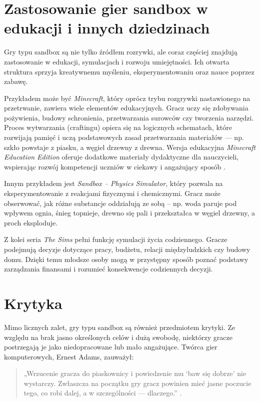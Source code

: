 \documentclass[a4paper,12pt]{book} %
\begin{document}
\section{Zastosowanie gier sandbox w edukacji i innych dziedzinach}

Gry typu sandbox są nie tylko źródłem rozrywki, ale coraz częściej znajdują zastosowanie w edukacji, symulacjach i rozwoju umiejętności. Ich otwarta struktura sprzyja kreatywnemu myśleniu, eksperymentowaniu oraz nauce poprzez zabawę.

Przykładem może być \textit{Minecraft}, który oprócz trybu rozgrywki nastawionego na przetrwanie, zawiera wiele elementów edukacyjnych. Gracz uczy się zdobywania pożywienia, budowy schronienia, przetwarzania surowców czy tworzenia narzędzi. Proces wytwarzania (craftingu) opiera się na logicznych schematach, które rozwijają pamięć i uczą podstawowych zasad przetwarzania materiałów --- np. szkło powstaje z piasku, a węgiel drzewny z drewna. Wersja edukacyjna \textit{Minecraft Education Edition} oferuje dodatkowe materiały dydaktyczne dla nauczycieli, wspierając rozwój kompetencji uczniów w ciekawy i angażujący sposób \cite{Minecraft_education}.

Innym przykładem jest  \textit{Sandbox – Physics Simulator}, który pozwala na eksperymentowanie z reakcjami fizycznymi i chemicznymi. Gracz może obserwować, jak różne substancje oddziałują ze sobą – np. woda paruje pod wpływem ognia, śnieg topnieje, drewno się pali i przekształca w węgiel drzewny, a proch eksploduje.

Z kolei seria \textit{The Sims} pełni funkcję symulacji życia codziennego. Gracze podejmują decyzje dotyczące pracy, budżetu, relacji międzyludzkich czy budowy domu. Dzięki temu młodsze osoby mogą w przystępny sposób poznać podstawy zarządzania finansami i rozumieć konsekwencje codziennych decyzji.

\section{Krytyka}

Mimo licznych zalet, gry typu sandbox są również przedmiotem krytyki. Ze względu na brak jasno określonych celów i dużą swobodę, niektórzy gracze postrzegają je jako niedopracowane lub mało angażujące. Twórca gier komputerowych, Ernest Adams, zauważył:
\begin{quote}
„Wrzucenie gracza do piaskownicy i powiedzenie mu ‘baw się dobrze’ nie wystarczy. Zwłaszcza na początku gry gracz powinien mieć jasne poczucie tego, co robi dalej, a w szczególności --- dlaczego.” \cite{Quote_1}.

\end{quote}
\end{document}
